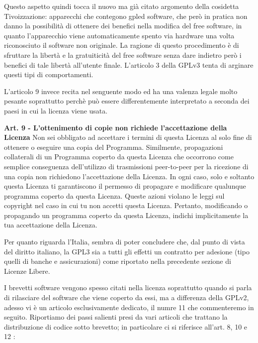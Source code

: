 Questo aspetto quindi tocca il nuovo ma già citato argomento della cosidetta Tivoizzazione: apparecchi che contegono gpled software, che però in pratica non danno la possibilità di ottenere dei benefici nella modifica del free software, in quanto l'apparecchio viene automaticamente spento via hardware una volta riconosciuto il software non originale. La ragione di questo procedimento è di sfruttare la libertà e la gratuiticità del free software senza dare indietro però i benefici di tale libertà all'utente finale. L'articolo 3 della GPLv3 tenta di arginare questi tipi di comportamenti.

L'articolo 9 invece recita nel senguente modo ed ha una valenza legale molto pesante soprattutto perchè può essere differentemente interpretato a seconda dei paesi in cui la licenza viene usata.\\


\begin{scriptsize}\textbf{Art. 9 - L'ottenimento di copie non richiede l'accettazione della Licenza}
Non sei obbligato ad accettare i termini di questa Licenza al solo fine di ottenere o eseguire una copia del Programma. Similmente, propagazioni collaterali di un Programma coperto da questa Licenza che occorrono come semplice conseguenza dell'utilizzo di trasmissioni peer-to-peer per la ricezione di una copia non richiedono l'accettazione della Licenza. In ogni caso, solo e soltanto questa Licenza ti garantiscono il permesso di propagare e modificare qualunque programma coperto da questa Licenza. Queste azioni violano le leggi sul copyright nel caso in cui tu non accetti questa Licenza. Pertanto, modificando o propagando un programma coperto da questa Licenza, indichi implicitamente la tua accettazione della Licenza.\\

\end{scriptsize}

Per quanto riguarda l'Italia, sembra di poter concludere che, dal punto di vista del diritto italiano, la GPL3 sia a tutti gli effetti un contratto per adesione (tipo quelli di banche e assicurazioni) come riportato nella precedente sezione di Licenze Libere.

I brevetti software vengono spesso citati nella licenza soprattutto quando si parla di rilasciare del software che viene coperto da essi, ma a differenza della GPLv2, adesso vi è un articolo esclusivamente dedicato, il numre 11 che commenteremo in seguito. Riportiamo dei passi salienti presi da vari articoli che trattano la distribuzione di codice sotto brevetto; in particolare ci si riferisce all'art. 8, 10 e 12 :\\ \newpage


